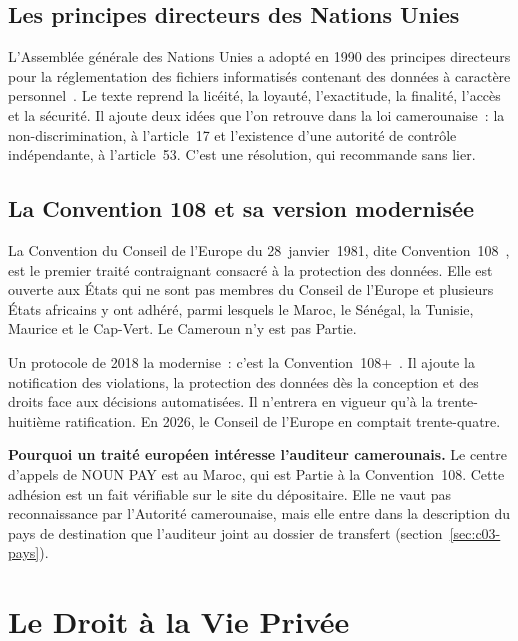 \subsection{Les principes directeurs des Nations Unies}

L'Assemblée générale des Nations Unies a adopté en 1990 des principes
directeurs pour la réglementation des fichiers informatisés contenant des
données à caractère personnel~\cite{onu1990}. Le texte reprend la licéité, la
loyauté, l'exactitude, la finalité, l'accès et la sécurité. Il ajoute deux
idées que l'on retrouve dans la loi camerounaise~: la non-discrimination, à
l'article~17 et l'existence d'une autorité de contrôle indépendante, à
l'article~53. C'est une résolution, qui recommande sans lier.

\subsection{La Convention 108 et sa version modernisée}

La Convention du Conseil de l'Europe du 28~janvier~1981, dite
Convention~108~\cite{coe1981conv108}, est le premier traité contraignant
consacré à la protection des données. Elle est ouverte aux États qui ne sont
pas membres du Conseil de l'Europe et plusieurs États africains y ont
adhéré, parmi lesquels le Maroc, le Sénégal, la Tunisie, Maurice et le
Cap-Vert. Le Cameroun n'y est pas Partie.

Un protocole de 2018 la modernise~: c'est la Convention~108+~\cite{coe2018conv108plus}.
Il ajoute la notification des violations, la protection des données dès la
conception et des droits face aux décisions automatisées. Il n'entrera en
vigueur qu'à la trente-huitième ratification. En 2026, le Conseil de
l'Europe en comptait trente-quatre.

\begin{boxinfo}
\textbf{Pourquoi un traité européen intéresse l'auditeur camerounais.} Le
centre d'appels de NOUN PAY est au Maroc, qui est Partie à la
Convention~108. Cette adhésion est un fait vérifiable sur le site du
dépositaire. Elle ne vaut pas reconnaissance par l'Autorité camerounaise,
mais elle entre dans la description du pays de destination que l'auditeur
joint au dossier de transfert (section~\ref{sec:c03-pays}).
\end{boxinfo}

\section{Le Droit à la Vie Privée}
\label{sec:c03-vieprivee}

